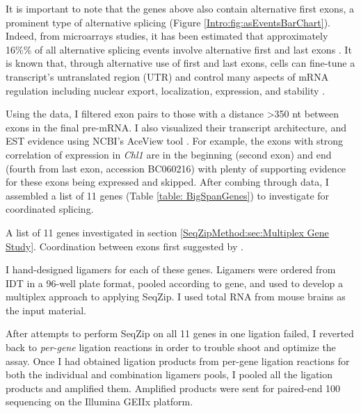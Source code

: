   It is important to note that the genes above also contain alternative first exons, a prominent type of alternative splicing (Figure \ref{Intro:fig:asEventsBarChart}). Indeed, from microarrays studies, it has been estimated that approximately 16\%\% of all alternative splicing events involve alternative first and last exons \citep{Bingham2008}. It is known that, through alternative use of first and last exons, cells can fine-tune a transcript's untranslated region (UTR) and control many aspects of mRNA regulation including nuclear export, localization, expression, and stability \citep{Hughes2006}.

  Using the \citet{Fagnani2007} data, I filtered exon pairs to those with a distance >350 nt between exons in the final pre-mRNA. I also visualized their transcript architecture, and EST evidence using NCBI's AceView tool \citep{Thierry-Mieg2006}. For example, the exons with strong correlation of expression in \textit{Chl1} are in the beginning (second exon) and end (fourth from last exon, accession BC060216) with plenty of supporting evidence for these exons being expressed and skipped. After combing through \citep{Fagnani2007} data, I assembled a list of 11 genes (Table \ref{table: BigSpanGenes}) to investigate for coordinated splicing.

  \begin{table} %
    \caption[Mouse genes with large sequence between suggested coordinated cassette exons]
      {
        A list of 11 genes investigated in section \ref{SeqZipMethod:sec:Multiplex Gene Study}. Coordination between exons first suggested by \citep{Fagnani2007}.
        }
    \label{table: BigSpanGenes}
    
    \end{table}

  I hand-designed ligamers for each of these genes. Ligamers were ordered from IDT in a 96-well plate format, pooled according to gene, and used to develop a multiplex approach to applying SeqZip. I used total RNA from mouse brains as the input material.

  After attempts to perform SeqZip on all 11 genes in one ligation failed, I reverted back to \textit{per-gene} ligation reactions in order to trouble shoot and optimize the assay. Once I had obtained ligation products from per-gene ligation reactions for both the individual and combination ligamers pools, I pooled all the ligation products and amplified them. Amplified products were sent for paired-end 100 sequencing on the Illumina GEIIx platform. 

